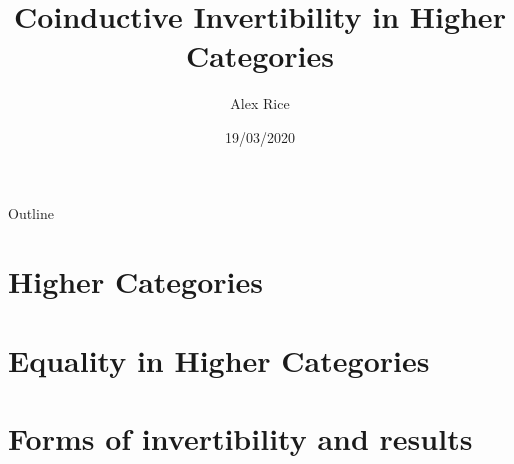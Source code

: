 \documentclass[presentation]{beamer}
\author{Alex Rice}
\date{19/03/2020}
\title{Coinductive Invertibility in Higher Categories}
\begin{document}
\maketitle
\begin{frame}{Outline}
\tableofcontents
\end{frame}

\section{Higher Categories}

\section{Equality in Higher Categories}

\section{Forms of invertibility and results}
\end{document}
